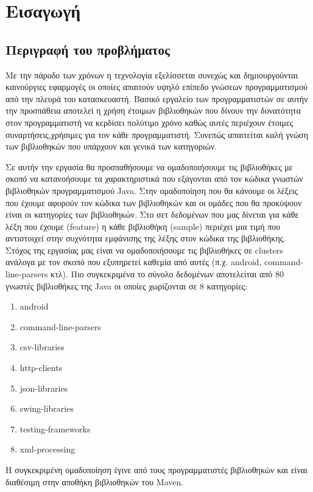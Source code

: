 \chapter{Εισαγωγή}
\section{Περιγραφή του προβλήματος}

Με την πάροδο των χρόνων η τεχνολογία εξελίσσεται συνεχώς και δημιουργούνται καινούργιες εφαρμογές οι οποίες απαιτούν υψηλό επίπεδο γνώσεων προγραμματισμού από την πλευρά του κατασκευαστή. Βασικό εργαλείο των προγραμματιστών σε αυτήν την προσπάθεια αποτελεί η χρήση έτοιμων βιβλιοθηκών που δίνουν την δυνατότητα στον προγραμματιστή να κερδίσει πολύτιμο χρόνο καθώς αυτές περιέχουν έτοιμες συναρτήσεις,χρήσιμες για τον κάθε προγραμματιστή. Συνεπώς απαιτείται καλή γνώση των βιβλιοθηκών που υπάρχουν και γενικά των κατηγοριών.

Σε αυτήν την εργασία θα προσπαθήσουμε να ομαδοποιήσουμε τις βιβλιοθήκες με σκοπό να κατανοήσουμε τα χαρακτηριστικά που εξάγονται από τον κώδικα γνωστών βιβλιοθηκών προγραμματισμού Java. Στην ομαδοποίηση που θα κάνουμε οι λέξεις που έχουμε αφορούν τον κώδικα των βιβλιοθηκών και οι ομάδες που θα προκύψουν είναι οι κατηγορίες των βιβλιοθηκών. Στο σετ δεδομένων που μας δίνεται για κάθε λέξη που έχουμε (feature) η κάθε βιβλιοθήκη (sample) περιέχει μια τιμή που αντιστοιχεί στην συχνότητα εμφάνισης της λέξης στον κώδικα της βιβλιοθήκης. Στόχος της εργασίας μας είναι να ομαδοποιήσουμε τις βιβλιοθήκες σε clusters ανάλογα με τον σκοπό που εξυπηρετεί καθεμία από αυτές (π.χ. android, command-line-parsers κτλ). Πιο συγκεκριμένα το σύνολο δεδομένων αποτελείται από 80 γνωστές βιβλιοθήκες της Java οι οποίες χωρίζονται σε 8 κατηγορίες:

\begin{enumerate}
	\item  android
	\item  command-line-parsers
	\item  csv-libraries
	\item  http-clients
	\item  json-libraries
	\item  swing-libraries
	\item  testing-frameworks
	\item  xml-processing
\end{enumerate} 

Η συγκεκριμένη ομαδοποίηση έγινε από τους προγραμματιστές βιβλιοθηκών και είναι διαθέσιμη στην αποθήκη βιβλιοθηκών του Maven.

